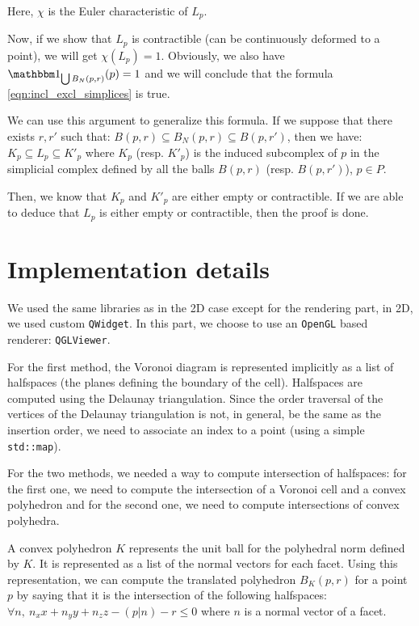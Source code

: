 Here, $ \chi $ is the Euler characteristic of $ L_p $.

Now, if we show that $ L_p $ is contractible (can be continuously deformed to a
point), we will get $ \chi(L_p) = 1 $. Obviously, we also have $
\indicator{\bigcup B_N(p, r)}(p) = 1 $ and we will conclude that the formula
\ref{eqn:incl_excl_simplices} is true.

We can use this argument to generalize this formula. If we suppose that there
exists $ r, r' $ such that: $ B(p, r) \subseteq B_N(p, r) \subseteq B(p, r') $,
then we have: $ K_p \subseteq L_p \subseteq K'_p $ where $ K_p $ (resp. $ K'_p $)
is the induced subcomplex of $ p $ in the simplicial complex defined by all the
balls $ B(p, r) $ (resp. $ B(p, r') $), $ p \in P $.

Then, we know that $ K_p $ and $ K'_p $ are either empty or contractible. If
we are able to deduce that $ L_p $ is either empty or contractible, then the
proof is done.


\section{Implementation details}
\label{sec:3d-implementation}

We used the same libraries as in the 2D case except for the rendering part, in
2D, we used custom \texttt{QWidget}. In this part, we choose to use an
\texttt{OpenGL} based renderer: \texttt{QGLViewer}.

For the first method, the Voronoi diagram is represented implicitly as a list of
halfspaces (the planes defining the boundary of the cell). Halfspaces are
computed using the Delaunay triangulation. Since the order traversal of the vertices
of the Delaunay triangulation is not, in general, be the same as the insertion
order, we need to associate an index to a point (using a simple
\texttt{std::map}).

For the two methods, we needed a way to compute intersection of halfspaces: for
the first one, we need to compute the intersection of a Voronoi cell and a
convex polyhedron and for the second one, we need to compute intersections of
convex polyhedra.

A convex polyhedron $ K $ represents the unit ball for the polyhedral norm
defined by $ K $. It is represented as a list of the normal vectors for each
facet. Using this representation, we can compute the translated polyhedron $
B_K(p, r) $ for a point $ p $ by saying that it is the intersection of the
following halfspaces: $ \forall n,~ n_x x + n_y y + n_z z - (p | n) - r \leq 0 $
where $ n $ is a normal vector of a facet.


